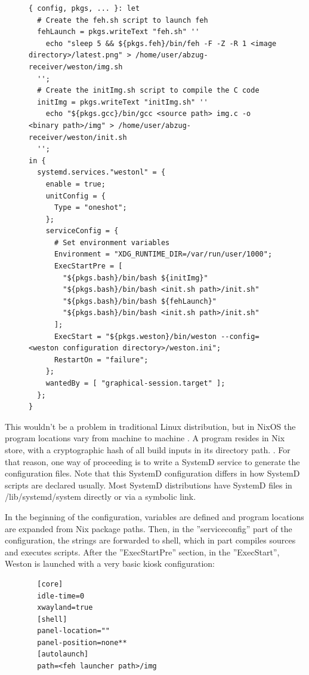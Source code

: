 \begin{figure}[H]
\begin{lstlisting} 
{ config, pkgs, ... }: let
  # Create the feh.sh script to launch feh
  fehLaunch = pkgs.writeText "feh.sh" ''
    echo "sleep 5 && ${pkgs.feh}/bin/feh -F -Z -R 1 <image directory>/latest.png" > /home/user/abzug-receiver/weston/img.sh
  '';
  # Create the initImg.sh script to compile the C code
  initImg = pkgs.writeText "initImg.sh" ''
    echo "${pkgs.gcc}/bin/gcc <source path> img.c -o <binary path>/img" > /home/user/abzug-receiver/weston/init.sh
  '';
in {
  systemd.services."westonl" = {
    enable = true;
    unitConfig = {
      Type = "oneshot";
    };
    serviceConfig = {
      # Set environment variables
      Environment = "XDG_RUNTIME_DIR=/var/run/user/1000";
      ExecStartPre = [
        "${pkgs.bash}/bin/bash ${initImg}"
        "${pkgs.bash}/bin/bash <init.sh path>/init.sh"
        "${pkgs.bash}/bin/bash ${fehLaunch}"
        "${pkgs.bash}/bin/bash <init.sh path>/init.sh"
      ];
      ExecStart = "${pkgs.weston}/bin/weston --config=<weston configuration directory>/weston.ini";
      RestartOn = "failure";
    };
    wantedBy = [ "graphical-session.target" ];
  };
}
\end{lstlisting}
\label{systemd1}
\end{figure}

This wouldn't be a problem in traditional Linux distribution, but in
NixOS the program locations vary from machine to machine
\cite{dolstra2010nixos}. A program resides in Nix store, with a
cryptographic hash of all build inputs in its directory
path. \cite{dolstra2010nixos}. For that reason, one way of proceeding
is to write a SystemD service to generate the configuration
files. Note that this SystemD configuration differs in how SystemD
scripts are declared usually. Most SystemD distributions have SystemD
files in /lib/systemd/system directly or via a symbolic link.

In the beginning of the configuration, variables are defined and
program locations are expanded from Nix package paths. Then, in the
''serviceconfig'' part of the configuration, the strings are forwarded
to shell, which in part compiles sources and executes scripts. After
the ''ExecStartPre'' section, in the ''ExecStart'', Weston is launched
with a very basic kiosk configuration:

\begin{figure}[H]
\begin{lstlisting} 
  [core]
  idle-time=0
  xwayland=true
  [shell]
  panel-location=""
  panel-position=none**
  [autolaunch]
  path=<feh launcher path>/img
\end{lstlisting}
\label{westonconf}
\end{figure}

